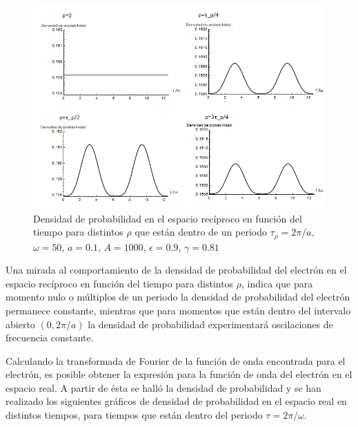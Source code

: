 \begin{figure}[H]
    \centering
    \includegraphics[width=1\columnwidth]{imagenes/dens_prop_tp1.png}
    \caption{Densidad de probabilidad en el espacio rec\'iproco en función del tiempo para distintos $\rho$ que están dentro de un periodo $\tau_{\rho}=2\pi/a$, $\omega=50$, $a=0.1$, $A=1000$, $\epsilon=0.9$, $\gamma=0.81$}
    \label{fig10.6}
\end{figure}

Una mirada al comportamiento de la densidad de probabilidad del electrón en el espacio recíproco en función del tiempo para distintos $\rho$, indica que para momento nulo o múltiplos de un periodo la densidad de probabilidad del electrón permanece constante, mientras que para momentos que están dentro del intervalo abierto $(0,2\pi/a)$  la densidad de probabilidad experimentará oscilaciones de frecuencia constante.  

Calculando la transformada de Fourier de la función de onda encontrada para el electrón, es posible obtener la expresión para la función de onda del electrón en el espacio real. A partir de ésta se halló la densidad de probabilidad y se han realizado los siguientes gráficos de densidad de probabilidad en el espacio real en distintos tiempos, para tiempos que están dentro del periodo $\tau=2\pi/\omega$. 

